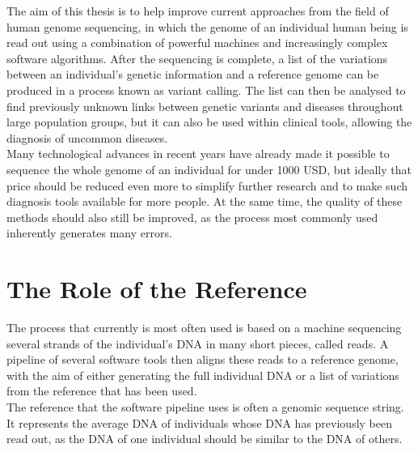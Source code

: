 \documentclass[a4paper,12pt,twoside,BCOR=10mm]{scrbook}
\begin{document}
The aim of this thesis is to help improve current approaches from the field of human genome sequencing, 
in which the genome of an individual human being is read out using a combination of 
powerful machines and increasingly complex software algorithms. 
After the sequencing is complete, a list of the variations between an individual's genetic information 
and a reference genome can be produced in a process known as variant calling. 
The list can then be analysed to find previously unknown links between genetic variants and 
diseases throughout large population groups, but it can also be used within clinical tools, allowing the 
diagnosis of uncommon diseases. \\
Many technological advances in recent years have already made it possible to sequence the whole genome 
of an individual for under 1000 USD, 
but ideally that price should be reduced even more to simplify further research and to make such diagnosis 
tools available for more people. At the same time, the quality of these methods should also still be improved, 
as the process most commonly used inherently generates many errors.

\section{The Role of the Reference}

The process that currently is most often used 
is based on a machine sequencing several strands of the 
individual's DNA in many short pieces, called reads. 
A pipeline of several software tools then aligns these reads to a reference genome, 
with the aim of either generating the full individual DNA or a list of variations 
from the reference that has been used. \\
The reference that the software pipeline uses is often a genomic sequence string. 
It represents the average DNA of individuals whose DNA has previously been read out, 
as the DNA of one individual should be similar to the DNA of others.
\end{document}
